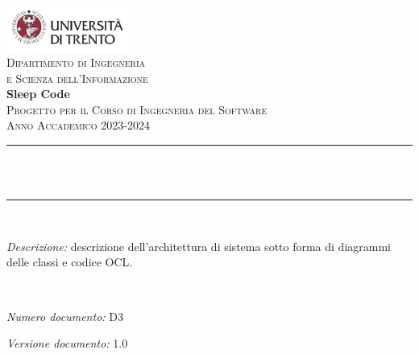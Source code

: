 \begin{titlepage}
    \newcommand{\HRule}{\rule{\linewidth}{0.3mm}} %
    \center %
    
    \includegraphics[width=0.3\textwidth]{materiale/elementi-copertina/UniTrento_logo_ITA_colore.png}\\[0.5cm]
    \textsc{\Large Dipartimento di Ingegneria\\e Scienza dell'Informazione}\\[1.5cm]
    
    {\Huge\textbf{Sleep Code}}\\[0.5cm]
    \textsc{\large Progetto per il Corso di Ingegneria del Software}\\
    \textsc{\large Anno Accademico 2023-2024}\\[0.5cm]
    
    
    \HRule\\[0.4cm]
    {\huge\bfseries \@title}\\[0.1cm]
    \HRule\\[1cm]
    
    \begin{minipage}{\textwidth}
    \textit{Descrizione:} descrizione dell'architettura di sistema sotto forma di diagrammi delle classi e codice OCL.
    \end{minipage}\\[1.5cm]
    
    
    \begin{minipage}{0.4\textwidth}
    \begin{flushleft}
    \large
    \textit{Numero documento:} D3
    \end{flushleft}
    \end{minipage}
    \begin{minipage}{0.4\textwidth}
    \begin{flushright}
    \large
    \textit{Versione documento:} 1.0
    \end{flushright}
    \end{minipage}\\[1.5cm]
    

\end{titlepage}
